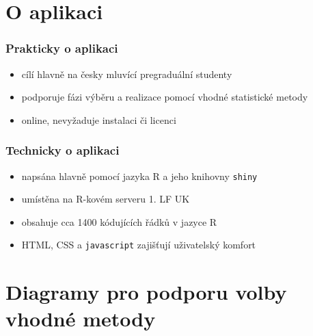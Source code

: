 \documentclass[t, compress]{beamer}
\begin{document}

\section{O aplikaci}


\begin{frame}
  \frametitle{%
    Prakticky o aplikaci%
  }
  \begin{itemize}
    \item cílí hlavně na česky mluvící pregraduální studenty
    \item podporuje fázi výběru a realizace pomocí vhodné statistické
    metody
    \item online, nevyžaduje instalaci či licenci    
  \end{itemize}
\end{frame}



\begin{frame}
  \frametitle{%
    Technicky o aplikaci%
  }
  \begin{itemize}
    \item napsána hlavně pomocí jazyka R a jeho knihovny \texttt{shiny}
    \item umístěna na R-kovém serveru 1. LF UK
    \item obsahuje cca 1400 kódujících řádků v jazyce R
    \item HTML, CSS a \texttt{javascript} zajišťují uživatelský komfort
  \end{itemize}
\end{frame}



\section{Diagramy pro podporu volby vhodné metody}
\end{document}
